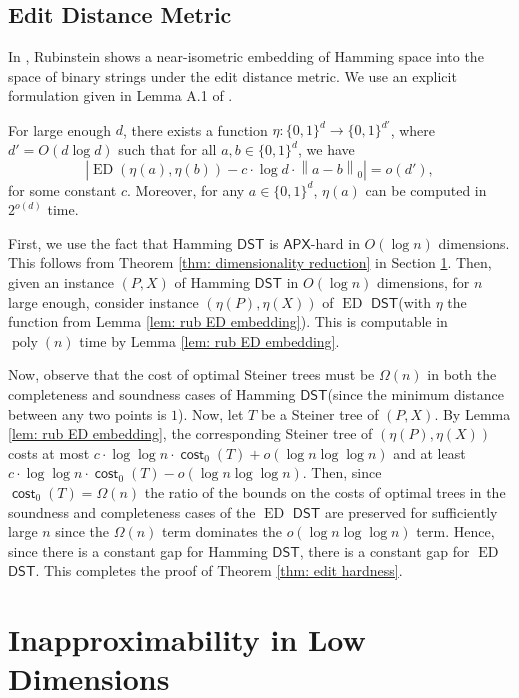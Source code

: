 \documentclass{article}\providecommand{\DeclareRedundantLanguages}[2]{}\usepackage[a4paper,margin=20mm]{geometry}
\DeclareMathOperator{\cost}{\mathsf{cost}}
\DeclareMathOperator{\ED}{ED}
\DeclareMathOperator{\poly}{poly}
\newcommand{\1}{\textbf{1}}
\newcommand{\norm}[1]{\left\lVert#1\right\rVert}
\newcommand{\dst}{$\mathsf{DST}$\xspace}
\newcommand{\apx}{$\mathsf{APX}$\xspace}
\begin{document}
\subsection{Edit Distance Metric}
In \cite{DBLP:conf/stoc/Rubinstein18}, Rubinstein shows a near-isometric embedding of Hamming space into the space of binary strings under the edit distance metric. We use an explicit formulation given in Lemma A.1 of \cite{CK19}.

\begin{lemma} \label{lem: rub ED embedding}
For large enough $d$, there exists a function $\eta: \{0,1\}^d \to \{0,1\}^{d'}$, where $d' = O(d \log d)$ such that for all $a, b \in \{0,1\}^d$, we have 
\[
|\ED(\eta(a), \eta(b)) - c \cdot \log d \cdot \norm{a - b}_0| = o(d'),
\]
for some constant $c$. Moreover, for any $a \in \{0,1\}^d$, $\eta(a)$ can be computed in $2^{o(d)}$ time.
\end{lemma}

First, we use the fact that Hamming \dst is \apx-hard in $O(\log n)$ dimensions. This follows from Theorem \ref{thm: dimensionality reduction} in Section \ref{sec: dimensionality reduction}. Then, given an instance $(P, X)$ of Hamming \dst in $O(\log n)$ dimensions, for $n$ large enough, consider instance $(\eta(P), \eta(X))$ of $\ED$ \dst (with $\eta$ the function from Lemma \ref{lem: rub ED embedding}). This is computable in $\poly (n)$ time by Lemma \ref{lem: rub ED embedding}. 

Now, observe that the cost of optimal Steiner trees must be $\Omega(n)$ in both the completeness and soundness cases of Hamming \dst (since the minimum distance between any two points is $1$). Now, let $T$ be a Steiner tree of $(P,X)$. By Lemma \ref{lem: rub ED embedding}, the corresponding Steiner tree of $(\eta(P), \eta(X))$ costs at most $c \cdot \log \log n \cdot \cost_0(T) + o(\log n \log \log n)$ and at least $c \cdot \log \log n \cdot \cost_0(T) - o(\log n \log \log n)$. Then, since $\cost_0(T) = \Omega(n)$ the ratio of the bounds on the costs of optimal trees in the soundness and completeness cases of the $\ED$ \dst are preserved for sufficiently large $n$ since the $\Omega(n)$ term dominates the $o(\log n \log \log n)$ term. Hence, since there is a constant gap for Hamming \dst, there is a constant gap for $\ED$ \dst. This completes the proof of Theorem \ref{thm: edit hardness}.



\section{Inapproximability in Low Dimensions} \label{sec: dimensionality reduction}
\end{document}
